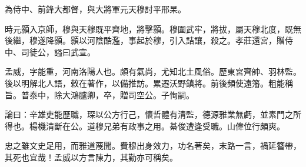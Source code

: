 \begin{pinyinscope}
 為侍中、前鋒大都督，與大將軍元天穆討平邢杲。



 時元顥入京師，穆與天穆既平齊地，將擊顥。穆圍武牢，將拔，屬天穆北度，既無後繼，穆遂降顥。顥以河陰酷濫，事起於穆，引入詰讓，殺之。孝莊還宮，贈侍中、司徒公，謚曰武宣。



 孟威，字能重，河南洛陽人也。頗有氣尚，尤知北土風俗。歷東宮齊帥、羽林監。後以明解北人語，敕在著作，以備推訪。累遷沃野鎮將。前後頻使遠籓。粗能稱旨。普泰中，除大鴻臚卿，卒，贈司空公。子恂嗣。



 論曰：辛雄吏能歷職，琛以公方行己，懷哲體有清監，德源雅業無虧，並素門之所得也。楊機清斷在公。道穆兄弟有政事之用。綦俊遭逢受職。山偉位行頗爽。



 忠之雖文史足用，而雅道蔑聞。費穆出身效力，功名著矣，末路一言，禍延簪帶，其死也宜哉！孟威以方言陳力，其勤亦可稱矣。



\end{pinyinscope}